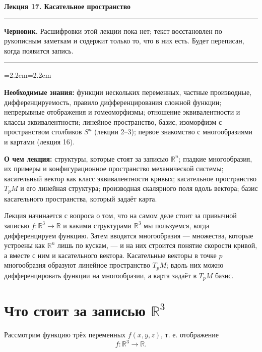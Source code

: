 \documentclass[11pt,a4paper]{article}
\newenvironment{lectureabout}{\begin{list}{}{\leftmargin=2.2em\rightmargin=2.2em}\small\item[]}{\end{list}\medskip}
\newenvironment{draftnote}{\begin{center}\begin{minipage}{0.9\textwidth}\small\hrule\smallskip}{\smallskip\hrule\end{minipage}\end{center}}
\begin{document}
\begin{center}
  {\Large\bfseries Лекция 17. Касательное пространство}
\end{center}
\medskip

\begin{draftnote}
\textbf{Черновик.} Расшифровки этой лекции пока нет; текст восстановлен по рукописным заметкам и содержит только то, что в них есть. Будет переписан, когда появится запись.
\end{draftnote}

\begin{lectureabout}
\textbf{Необходимые знания:} функции нескольких переменных, частные производные, дифференцируемость, правило дифференцирования сложной функции; непрерывные отображения и гомеоморфизмы; отношение эквивалентности и классы эквивалентности; линейное пространство, базис, изоморфизм с пространством столбиков $S^n$ (лекции 2–3); первое знакомство с многообразиями и картами (лекция 16).

\smallskip
\textbf{О чем лекция:} структуры, которые стоят за записью $\mathbb{R}^n$; гладкие многообразия, их примеры и конфигурационное пространство механической системы; касательный вектор как класс эквивалентности кривых; касательное пространство $T_pM$ и его линейная структура; производная скалярного поля вдоль вектора; базис касательного пространства, который задаёт карта.
\end{lectureabout}

Лекция начинается с вопроса о том, что на самом деле стоит за привычной записью $f\colon \mathbb{R}^3 \to \mathbb{R}$ и какими структурами $\mathbb{R}^3$ мы пользуемся, когда дифференцируем функцию. Затем вводятся многообразия — множества, которые устроены как $\mathbb{R}^n$ лишь по кускам, — и на них строится понятие скорости кривой, а вместе с ним и касательного вектора. Касательные векторы в точке $p$ многообразия образуют линейное пространство $T_pM$; вдоль них можно дифференцировать функции на многообразии, а карта задаёт в $T_pM$ базис.

\section{Что стоит за записью $\mathbb{R}^3$}

Рассмотрим функцию трёх переменных $f(x, y, z)$, т. е. отображение
\[
f\colon \mathbb{R}^3 \to \mathbb{R}.
\]
\end{document}
